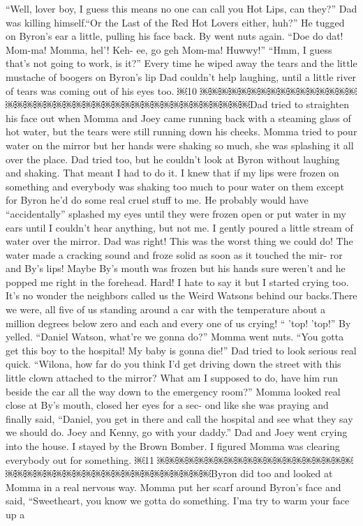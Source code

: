 \documentclass{standard}
\begin{document}
“Well, lover boy, I guess this means no one can call you Hot Lips, can they?”
Dad was killing himself.“Or the Last of the Red Hot Lovers either, huh?” He tugged on Byron’s ear a little, pulling his face back.
By went nuts again. “Doe do dat! Mom-ma! Momma, hel’! Keh- ee, go geh Mom-ma! Huwwy!”
“Hmm, I guess that’s not going to work, is it?”
Every time he wiped away the tears and the little mustache of boogers on Byron’s lip Dad couldn’t help laughing, until a little river of tears was coming out of his eyes too.
￼10
￼￼￼￼￼￼￼￼￼￼￼￼￼￼￼￼￼￼￼￼￼￼￼￼￼￼￼￼￼￼￼￼￼￼￼￼￼￼￼￼￼Dad tried to straighten his face out when Momma and Joey came running back with a steaming glass of hot water, but the tears were still running down his cheeks.
Momma tried to pour water on the mirror but her hands were shaking so much, she was splashing it all over the place. Dad tried too, but he couldn’t look at Byron without laughing and shaking.
That meant I had to do it.
I knew that if my lips were frozen on something and everybody was shaking too much to pour water on them except for Byron he’d do some real cruel stuff to me. He probably would have “accidentally” splashed my eyes until they were frozen open or put water in my ears until I couldn’t hear anything, but not me. I gently poured a little stream of water over the mirror.
Dad was right! This was the worst thing we could do! The water made a cracking sound and froze solid as soon as it touched the mir- ror and By’s lips!
Maybe By’s mouth was frozen but his hands sure weren’t and he popped me right in the forehead. Hard! I hate to say it but I started crying too.
It’s no wonder the neighbors called us the Weird Watsons behind our backs.There we were, all five of us standing around a car with the temperature about a million degrees below zero and each and every one of us crying!
“ ’top! ’top!” By yelled.
“Daniel Watson, what’re we gonna do?” Momma went nuts. “You gotta get this boy to the hospital! My baby is gonna die!”
Dad tried to look serious real quick.
“Wilona, how far do you think I’d get driving down the street with this little clown attached to the mirror? What am I supposed to do, have him run beside the car all the way down to the emergency room?”
Momma looked real close at By’s mouth, closed her eyes for a sec- ond like she was praying and finally said, “Daniel, you get in there and call the hospital and see what they say we should do. Joey and Kenny, go with your daddy.”
Dad and Joey went crying into the house. I stayed by the Brown Bomber. I figured Momma was clearing everybody out for something.
￼11
￼￼￼￼￼￼￼￼￼￼￼￼￼￼￼￼￼￼￼￼￼￼￼￼￼￼￼￼￼￼￼￼￼￼￼￼￼￼￼￼￼Byron did too and looked at Momma in a real nervous way. Momma put her scarf around Byron’s face and said, “Sweetheart, you know we gotta do something. I’ma try to warm your face up a
\end{document}
